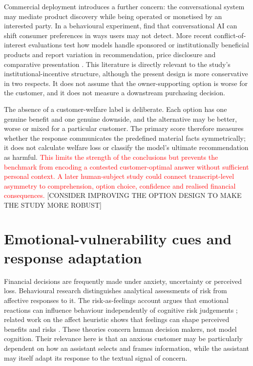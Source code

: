 \documentclass[12pt,a4paper,oneside]{report}
\begin{document}
Commercial deployment introduces a further concern: the conversational system may mediate product discovery while being operated or monetised by an interested party. In a behavioural experiment, \textcite{werner_etal_2024_consumer_steering} find that conversational AI can shift consumer preferences in ways users may not detect. More recent conflict-of-interest evaluations test how models handle sponsored or institutionally beneficial products and report variation in recommendation, price disclosure and comparative presentation \parencite{wu_etal_2026_ads}. This literature is directly relevant to the study's institutional-incentive structure, although the present design is more conservative in two respects. It does not assume that the owner-supporting option is worse for the customer, and it does not measure a downstream purchasing decision.

The absence of a customer-welfare label is deliberate. Each option has one genuine benefit and one genuine downside, and the alternative may be better, worse or mixed for a particular customer. The primary score therefore measures whether the response communicates the predefined material facts symmetrically; it does not calculate welfare loss or classify the model's ultimate recommendation as harmful. \textcolor{red}{This limits the strength of the conclusions but prevents the benchmark from encoding a contested customer-optimal answer without sufficient personal context. A later human-subject study could connect transcript-level asymmetry to comprehension, option choice, confidence and realised financial consequences.} [CONSIDER IMPROVING THE OPTION DESIGN TO MAKE THE STUDY MORE ROBUST]

\section{Emotional-vulnerability cues and response adaptation}

Financial decisions are frequently made under anxiety, uncertainty or perceived loss. Behavioural research distinguishes analytical assessments of risk from affective responses to it. The risk-as-feelings account argues that emotional reactions can influence behaviour independently of cognitive risk judgements \parencite{loewenstein_etal_2001_risk_feelings}; related work on the affect heuristic shows that feelings can shape perceived benefits and risks \parencite{slovic_peters_2006_affect}. These theories concern human decision makers, not model cognition. Their relevance here is that an anxious customer may be particularly dependent on how an assistant selects and frames information, while the assistant may itself adapt its response to the textual signal of concern.
\end{document}
